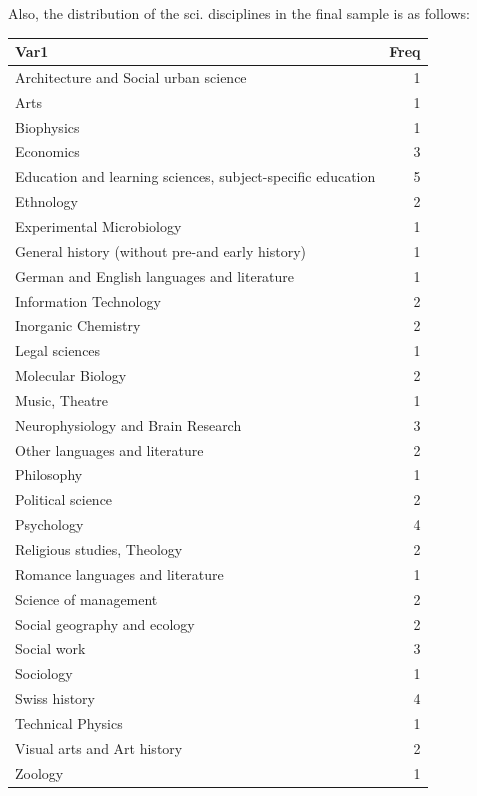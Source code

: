 \documentclass[]{tufte-book}
\begin{document}
Also, the distribution of the sci. disciplines in the final sample is as
follows:

\begin{longtable}[]{@{}lr@{}}
\toprule()
Var1 & Freq \\
\midrule()
\endhead
Architecture and Social urban science & 1 \\
Arts & 1 \\
Biophysics & 1 \\
Economics & 3 \\
Education and learning sciences, subject-specific education & 5 \\
Ethnology & 2 \\
Experimental Microbiology & 1 \\
General history (without pre-and early history) & 1 \\
German and English languages and literature & 1 \\
Information Technology & 2 \\
Inorganic Chemistry & 2 \\
Legal sciences & 1 \\
Molecular Biology & 2 \\
Music, Theatre & 1 \\
Neurophysiology and Brain Research & 3 \\
Other languages and literature & 2 \\
Philosophy & 1 \\
Political science & 2 \\
Psychology & 4 \\
Religious studies, Theology & 2 \\
Romance languages and literature & 1 \\
Science of management & 2 \\
Social geography and ecology & 2 \\
Social work & 3 \\
Sociology & 1 \\
Swiss history & 4 \\
Technical Physics & 1 \\
Visual arts and Art history & 2 \\
Zoology & 1 \\
\bottomrule()
\end{longtable}


\end{document}
